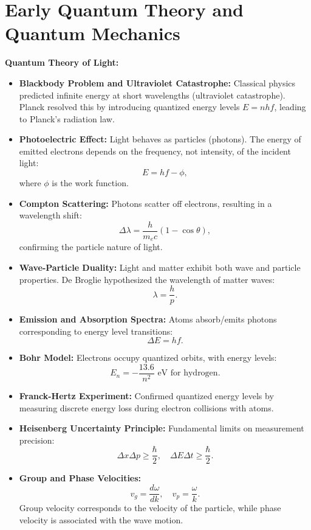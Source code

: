 \documentclass{article}
\newcommand{\conceptbox}[1]{\begin{tcolorbox}[colback=blue!10] #1 \end{tcolorbox}}
\begin{document}
\section{Early Quantum Theory and Quantum Mechanics}
\conceptbox{
\textbf{Quantum Theory of Light:}
\begin{itemize}
    \item \textbf{Blackbody Problem and Ultraviolet Catastrophe:}
    Classical physics predicted infinite energy at short wavelengths (ultraviolet catastrophe). Planck resolved this by introducing quantized energy levels \( E = nhf \), leading to Planck's radiation law.
    
    \item \textbf{Photoelectric Effect:}
    Light behaves as particles (photons). The energy of emitted electrons depends on the frequency, not intensity, of the incident light:
    \[
    E = hf - \phi,
    \]
    where \( \phi \) is the work function.

    \item \textbf{Compton Scattering:}
    Photons scatter off electrons, resulting in a wavelength shift:
    \[
    \Delta \lambda = \frac{h}{m_e c} (1 - \cos\theta),
    \]
    confirming the particle nature of light.

    \item \textbf{Wave-Particle Duality:}
    Light and matter exhibit both wave and particle properties. De Broglie hypothesized the wavelength of matter waves:
    \[
    \lambda = \frac{h}{p}.
    \]

    \item \textbf{Emission and Absorption Spectra:}
    Atoms absorb/emits photons corresponding to energy level transitions:
    \[
    \Delta E = hf.
    \]

    \item \textbf{Bohr Model:}
    Electrons occupy quantized orbits, with energy levels:
    \[
    E_n = -\frac{13.6}{n^2} \text{ eV for hydrogen}.
    \]

    \item \textbf{Franck-Hertz Experiment:}
    Confirmed quantized energy levels by measuring discrete energy loss during electron collisions with atoms.

    \item \textbf{Heisenberg Uncertainty Principle:}
    Fundamental limits on measurement precision:
    \[
    \Delta x \Delta p \geq \frac{\hbar}{2}, \quad \Delta E \Delta t \geq \frac{\hbar}{2}.
    \]

    \item \textbf{Group and Phase Velocities:}
    \[
    v_g = \frac{d\omega}{dk}, \quad v_p = \frac{\omega}{k}.
    \]
    Group velocity corresponds to the velocity of the particle, while phase velocity is associated with the wave motion.
\end{itemize}
}
\end{document}

